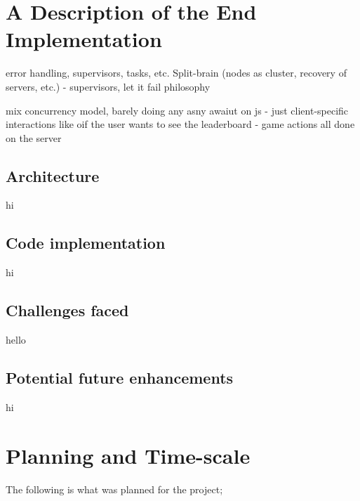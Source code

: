 \documentclass[]{final}
\begin{document}

\chapter{A Description of the End Implementation}

error handling, supervisors, tasks, etc.
Split-brain (nodes as cluster, recovery of servers, etc.) - supervisors, let it fail philosophy

mix concurrency model, barely doing any asny awaiut on js - just client-specific
interactions like oif the user wants to see the leaderboard - game actions all done on the server
\section{Architecture}
hi%
\section{Code implementation}
hi%
\section{Challenges faced}
hello%
\section{Potential future enhancements}
hi%

\chapter{Planning and Time-scale}


The following is what was planned for the project;
\end{document}
